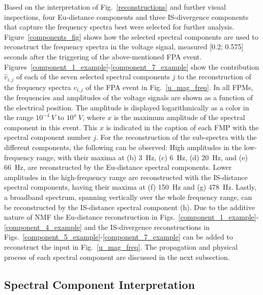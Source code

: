 \documentclass[lettersize,journal]{IEEEtran}
\begin{document}
Based on the interpretation of Fig.~\ref{reconstructions} and further visual inspections, four Eu-distance components and three IS-divergence components that capture the frequency spectra best were selected for further analysis.
Figure~\ref{components_fig} shows how the selected spectral components are used to reconstruct the frequency spectra in the voltage signal, measured [0.2; 0.575] seconds after the triggering of the above-mentioned FPA event.
Figures~\ref{component_1_example}-\ref{component_7_example} show the contribution $\hat{v}_{i,j}$ of each of the seven selected spectral components $j$ to the reconstruction of the frequency spectra $v_{i,j}$ of the FPA event in Fig.~\ref{u_mag_freq}.
In all FPMs, the frequencies and amplitudes of the voltage signals are shown as a function of the electrical position.
The amplitude is displayed logarithmically as a color in the range $10^{-4}~V$ to $10^x~V$, where $x$ is the maximum amplitude of the spectral component in this event.
This $x$ is indicated in the caption of each FMP with the spectral component number $j$.
For the reconstruction of the sub-spectra with the different components, the following can be observed:
High amplitudes in the low-frequency range, with their maxima at (b) 3~Hz, (c) 6~Hz, (d) 20~Hz, and (e) 66~Hz, are reconstructed by the Eu-distance spectral components.
Lower amplitudes in the high-frequency range are reconstructed with the IS-distance spectral components, having their maxima at (f) 150~Hz and (g) 478~Hz.
Lastly, a broadband spectrum, spanning vertically over the whole frequency range, can be reconstructed by the IS-distance spectral component (h).
Due to the additive nature of NMF the Eu-distance reconstruction in Figs.~\ref{component_1_example}-\ref{component_4_example} and the IS-divergence reconstructions in Figs.~\ref{component_5_example}-\ref{component_7_example} can be added to reconstruct the input in Fig.~\ref{u_mag_freq}. 
The propagation and physical process of each spectral component are discussed in the next subsection.

\subsection{Spectral Component Interpretation}\label{Results Component Interpretation}
\end{document}
